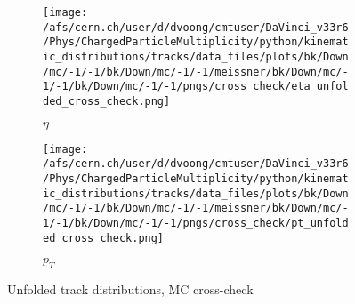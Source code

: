 \begin{figure}[h]
	\begin{subfigure}[h]{0.49\textwidth}
		\texttt{[image: /afs/cern.ch/user/d/dvoong/cmtuser/DaVinci\_v33r6/Phys/ChargedParticleMultiplicity/python/kinematic\_distributions/tracks/data\_files/plots/bk/Down/mc/-1/-1/bk/Down/mc/-1/-1/meissner/bk/Down/mc/-1/-1/bk/Down/mc/-1/-1/pngs/cross\_check/eta\_unfolded\_cross\_check.png]}
		\caption{$\eta$}
		\label{fig: background corrected track distributions eta}
	\end{subfigure}
	\begin{subfigure}[h]{0.49\textwidth}
		\texttt{[image: /afs/cern.ch/user/d/dvoong/cmtuser/DaVinci\_v33r6/Phys/ChargedParticleMultiplicity/python/kinematic\_distributions/tracks/data\_files/plots/bk/Down/mc/-1/-1/bk/Down/mc/-1/-1/meissner/bk/Down/mc/-1/-1/bk/Down/mc/-1/-1/pngs/cross\_check/pt\_unfolded\_cross\_check.png]}
		\caption{$p_T$}
		\label{fig: background corrected track distributions pt}
	\end{subfigure}
	\caption{Unfolded track distributions, MC cross-check}
	\label{fig: unfolded track distributions cross-check}
\end{figure}

